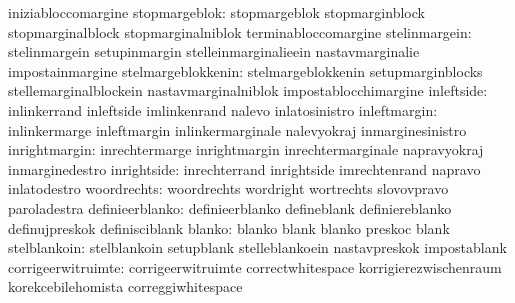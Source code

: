                                   iniziabloccomargine
                   stopmargeblok: stopmargeblok                    stopmarginblock
                                  stopmarginalblock                stopmarginalniblok
                                  terminabloccomargine
                   stelinmargein: stelinmargein                    setupinmargin
                                  stelleinmarginalieein            nastavmarginalie
                                  impostainmargine
              stelmargeblokkenin: stelmargeblokkenin               setupmarginblocks
                                  stellemarginalblockein           nastavmarginalniblok
                                  impostablocchimargine
                      inleftside: inlinkerrand                     inleftside
                                  imlinkenrand                     nalevo
                                  inlatosinistro
                    inleftmargin: inlinkermarge                    inleftmargin
                                  inlinkermarginale                nalevyokraj
                                  inmarginesinistro
                   inrightmargin: inrechtermarge                   inrightmargin
                                  inrechtermarginale               napravyokraj
                                  inmarginedestro
                     inrightside: inrechterrand                    inrightside
                                  imrechtenrand                    napravo
                                  inlatodestro
                     woordrechts: woordrechts                      wordright
                                  wortrechts                       slovovpravo
                                  paroladestra
                 definieerblanko: definieerblanko                  defineblank
                                  definiereblanko                  definujpreskok
                                  definisciblank                   %
                          blanko: blanko                           blank
                                  blanko                           preskoc
                                  blank
                    stelblankoin: stelblankoin                     setupblank
                                  stelleblankoein                  nastavpreskok
                                  impostablank
              corrigeerwitruimte: corrigeerwitruimte               correctwhitespace
                                  korrigierezwischenraum           korekcebilehomista
                                  correggiwhitespace
